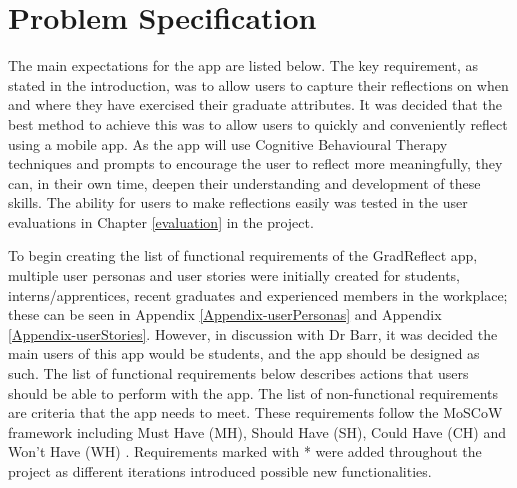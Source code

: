 \documentclass{l4proj}
\begin{document}
\section{Problem Specification}

The main expectations for the app are listed below. The key requirement, as stated in the introduction, was to allow users to capture their reflections on when and where they have exercised their graduate attributes. It was decided that the best method to achieve this was to allow users to quickly and conveniently reflect using a mobile app. As the app will use Cognitive Behavioural Therapy techniques and prompts to encourage the user to reflect more meaningfully, they can, in their own time, deepen their understanding and development of these skills. The ability for users to make reflections easily was tested in the user evaluations in Chapter \ref{evaluation} in the project. 

To begin creating the list of functional requirements of the GradReflect app, multiple user personas and user stories were initially created for students, interns/apprentices, recent graduates and experienced members in the workplace; these can be seen in Appendix \ref{Appendix-userPersonas} and Appendix \ref{Appendix-userStories}. However, in discussion with Dr Barr, it was decided the main users of this app would be students, and the app should be designed as such. The list of functional requirements below describes actions that users should be able to perform with the app. The list of non-functional requirements are criteria that the app needs to meet. These requirements follow the MoSCoW framework including Must Have (MH), Should Have (SH), Could Have (CH) and Won’t Have (WH) \citep{consortium_chapter_2014}. Requirements marked with * were added throughout the project as different iterations introduced possible new functionalities.
\end{document}
